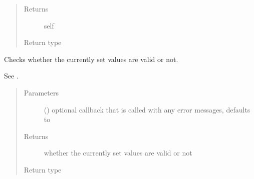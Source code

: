 \documentclass[letterpaper,10pt,english]{sphinxmanual}
\begin{document}
\begin{fulllineitems}
\begin{fulllineitems}
\begin{quote}
\begin{description}
\item[{Returns}] \leavevmode
\sphinxAtStartPar
self

\item[{Return type}] \leavevmode
\sphinxAtStartPar
{\hyperref[\detokenize{autoapi/pine/client/models/index:pine.client.models.CollectionBuilder}]{}}

\end{description}\end{quote}

\end{fulllineitems}


\begin{fulllineitems}
\label{\detokenize{autoapi/pine/client/index:pine.client.CollectionBuilder.is_valid}}
\sphinxAtStartPar
Checks whether the currently set values are valid or not.

\sphinxAtStartPar
See {\hyperref[\detokenize{autoapi/pine/client/models/index:pine.client.models.is_valid_collection}]{}}.
\begin{quote}\begin{description}
\item[{Parameters}] \leavevmode
\sphinxAtStartPar
{} (\sphinxstyleliteralemphasis{\sphinxupquote{, }}) \textendash{} optional callback that is called with any error messages, defaults to 

\item[{Returns}] \leavevmode
\sphinxAtStartPar
whether the currently set values are valid or not

\item[{Return type}] \leavevmode
\sphinxAtStartPar
{}

\end{description}\end{quote}

\end{fulllineitems}


\end{fulllineitems}
\end{document}
